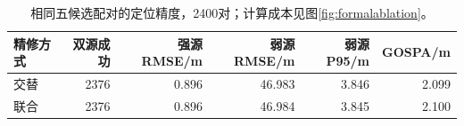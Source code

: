 \begin{table}[pos=H]\centering\small
\caption{相同五候选配对的定位精度，2400对；计算成本见图\ref{fig:formalablation}。}\label{tab:fivepair}
\begin{tabular}{@{}lrrrrr@{}}\toprule
精修方式 & 双源成功 & 强源RMSE/m & 弱源RMSE/m & 弱源P95/m & GOSPA/m\\\midrule
交替 & 2376 & 0.896 & 46.983 & 3.846 & 2.099\\
联合 & 2376 & 0.896 & 46.984 & 3.845 & 2.100\\
\bottomrule\end{tabular}\end{table}
